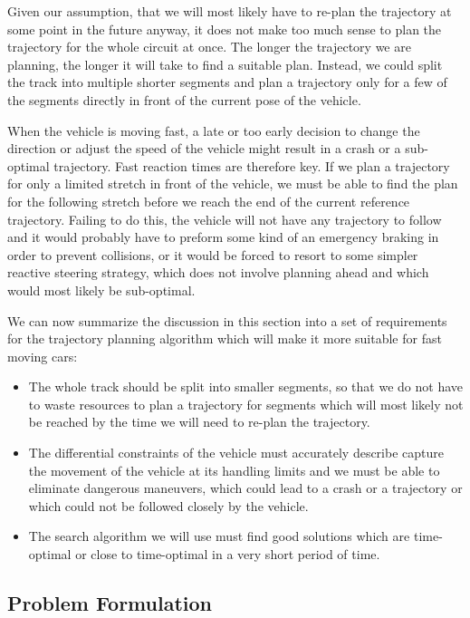 Given our assumption, that we will most likely have to re-plan the trajectory at some point in the future anyway, it does not make too much sense to plan the trajectory for the whole circuit at once. The longer the trajectory we are planning, the longer it will take to find a suitable plan. Instead, we could split the track into multiple shorter segments and plan a trajectory only for a few of the segments directly in front of the current pose of the vehicle.

When the vehicle is moving fast, a late or too early decision to change the direction or adjust the speed of the vehicle might result in a crash or a sub-optimal trajectory. Fast reaction times are therefore key. If we plan a trajectory for only a limited stretch in front of the vehicle, we must be able to find the plan for the following stretch before we reach the end of the current reference trajectory. Failing to do this, the vehicle will not have any trajectory to follow and it would probably have to preform some kind of an emergency braking in order to prevent collisions, or it would be forced to resort to some simpler reactive steering strategy, which does not involve planning ahead and which would most likely be sub-optimal.

We can now summarize the discussion in this section into a set of requirements for the trajectory planning algorithm which will make it more suitable for fast moving cars:

\begin{itemize}
	\item The whole track should be split into smaller segments, so that we do not have to waste resources to plan a trajectory for segments which will most likely not be reached by the time we will need to re-plan the trajectory.
	\item The differential constraints of the vehicle must accurately describe capture the movement of the vehicle at its handling limits and we must be able to eliminate dangerous maneuvers, which could lead to a crash or a trajectory or which could not be followed closely by the vehicle.
	\item The search algorithm we will use must find good solutions which are time-optimal or close to time-optimal in a very short period of time.
\end{itemize}

\subsection{Problem Formulation}

